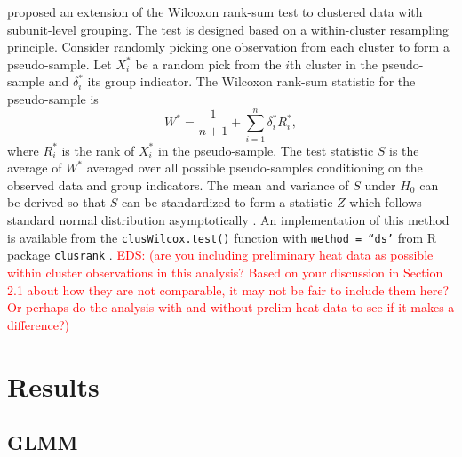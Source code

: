 \documentclass[12pt, letterpaper, titlepage]{article}
\newcommand{\eds}[1]{\textcolor{red}{EDS: (#1)}}
\begin{document}
\citet{datta2005rank} proposed an extension of the Wilcoxon rank-sum test to
clustered data with subunit-level grouping. The test is designed based on a
within-cluster resampling principle. Consider randomly picking one observation
from each cluster to form a pseudo-sample. Let $X_i^*$ be a random pick from the
$i$th cluster in the pseudo-sample and $\delta_i^*$ its group indicator. The
Wilcoxon rank-sum statistic for the pseudo-sample is
\[
W^* = \frac{1}{n + 1} + \sum_{i=1}^{n} \delta_{i}^{*} R_{i}^{*},
\]
where $R_{i}^{*}$ is the rank of $X_{i}^{*}$ in the pseudo-sample.
The test statistic $S$ is the average of $W^*$ averaged over all possible
pseudo-samples conditioning on the observed data and group indicators.
The mean and variance of $S$ under $H_0$ can be derived so that $S$ can be
standardized to form a statistic $Z$ which follows standard normal distribution
asymptotically \citep[p.910]{datta2005rank}. An implementation of this method is
available from the \texttt{clusWilcox.test()} function with
\texttt{method = ``ds'} from R package \texttt{clusrank}
\citep{jiang2017wilcoxon}.
\eds{are you including preliminary heat data as possible within cluster 
observations in this analysis?  Based on your 
discussion in Section 2.1 about how they are not comparable, it may not be fair 
to include them here?  Or perhaps do the analysis with and without prelim heat
data to see if it makes a difference?}



\section{Results} \label{sec:Results}

\subsection{GLMM} \label{subsec:Results_GLMM}
\end{document}
